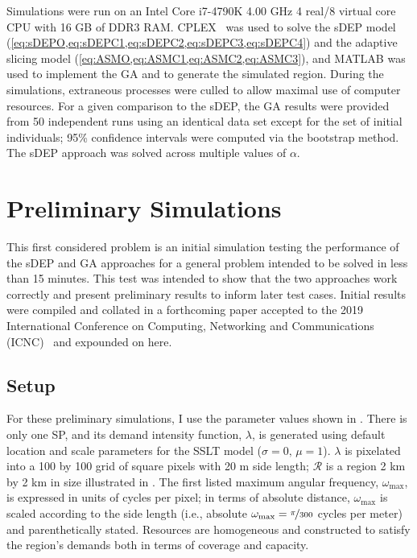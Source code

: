 \documentclass[12pt,dvipsnames]{report}
\begin{document}
Simulations were run on an Intel Core i7-4790K 4.00 GHz 4 real/8 virtual core CPU with 16 GB of DDR3 RAM.  CPLEX~\cite{Cplex} was used to solve the sDEP model (\cref{eq:sDEPO,eq:sDEPC1,eq:sDEPC2,eq:sDEPC3,eq:sDEPC4}) and the adaptive slicing model (\cref{eq:ASMO,eq:ASMC1,eq:ASMC2,eq:ASMC3}), and MATLAB was used to implement the GA and to generate the simulated region.  During the simulations, extraneous processes were culled to allow maximal use of computer resources.  For a given comparison to the sDEP, the GA results were provided from 50 independent runs using an identical data set except for the set of initial individuals; 95\% confidence intervals were computed via the bootstrap method.  The sDEP approach was solved across multiple values of $\alpha$.

\section{Preliminary Simulations} \label{sec:prelim}

This first considered problem is an initial simulation testing the performance of the sDEP and GA approaches for a general problem intended to be solved in less than 15 minutes.  This test was intended to show that the two approaches work correctly and present preliminary results to inform later test cases.  Initial results were compiled and collated in a forthcoming paper accepted to the 2019 International Conference on Computing, Networking and Communications (ICNC)~\cite{KTeague:BSSelection} and expounded on here.

\subsection{Setup} \label{subsec:prelim_setup}

For these preliminary simulations, I use the parameter values shown in .  There is only one SP, and its demand intensity function, $\lambda$, is generated using default location and scale parameters for the SSLT model ($\sigma = 0,\, \mu = 1$).  $\lambda$ is pixelated into a 100 by 100 grid of square pixels with 20 m side length; $\mathcal{R}$ is a region 2 km by 2 km in size illustrated in .  The first listed maximum angular frequency, $\omega_{\max}$, is expressed in units of cycles per pixel; in terms of absolute distance, $\omega_{\max}$ is scaled according to the side length (i.e., absolute $\omega_{\max} = \nicefrac{\pi}{300}$ cycles per meter) and parenthetically stated.  Resources are homogeneous and constructed to satisfy the region's demands both in terms of coverage and capacity.
\end{document}
